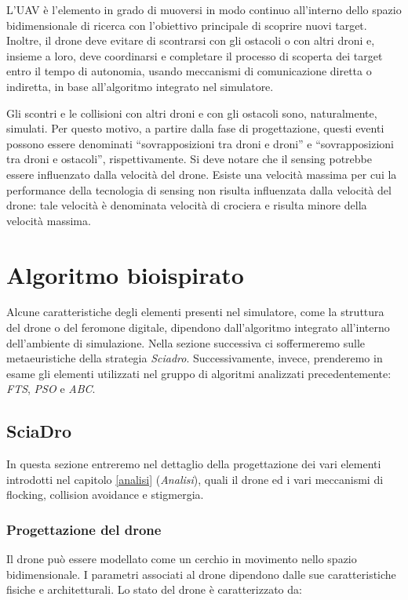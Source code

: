 L'UAV è l'elemento in grado di muoversi in modo continuo all’interno dello spazio bidimensionale di ricerca con l’obiettivo principale di scoprire nuovi target. 
Inoltre, il drone deve evitare di scontrarsi con gli ostacoli o con altri droni e, insieme a loro, deve coordinarsi e completare il processo di scoperta dei target entro il tempo di autonomia, usando meccanismi di comunicazione diretta o indiretta, in base all’algoritmo integrato nel simulatore. 

Gli scontri e le collisioni con altri droni e con gli ostacoli sono, naturalmente, simulati. 
Per questo motivo, a partire dalla fase di progettazione, questi eventi possono essere denominati “sovrapposizioni tra droni e droni” e “sovrapposizioni tra droni e ostacoli”, rispettivamente. 
Si deve notare che il sensing potrebbe essere influenzato dalla velocità del drone. 
Esiste una velocità massima per cui la performance della tecnologia di sensing non risulta influenzata dalla velocità del drone: tale velocità è denominata velocità di crociera e risulta minore della velocità massima.

\section {Algoritmo bioispirato}

Alcune caratteristiche degli elementi presenti nel simulatore, come la struttura del drone o del feromone digitale, dipendono dall'algoritmo integrato all'interno dell'ambiente di simulazione.
Nella sezione successiva ci soffermeremo sulle metaeuristiche della strategia \textit{Sciadro}.
Successivamente, invece, prenderemo in esame gli elementi utilizzati nel gruppo di algoritmi analizzati precedentemente: \textit{FTS}, \textit{PSO} e \textit{ABC}.

\subsection{SciaDro}

In questa sezione entreremo nel dettaglio della progettazione dei vari elementi introdotti nel capitolo \ref{analisi} (\textit{Analisi}), quali il drone ed i vari meccanismi di flocking, collision avoidance e stigmergia.

\subsubsection{Progettazione del drone}

Il drone può essere modellato come un cerchio in movimento nello spazio bidimensionale. 
I parametri associati al drone dipendono dalle sue caratteristiche fisiche e architetturali. 
Lo stato del drone è caratterizzato da:

